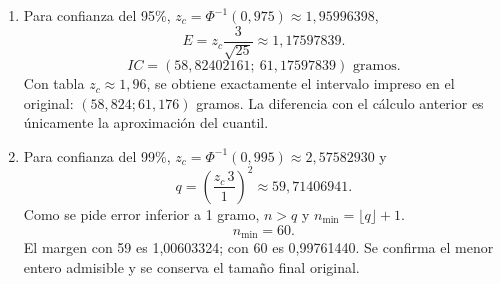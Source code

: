 \documentclass[11pt]{article}
\begin{document}
\begin{enumerate}[label=(\alph*)]\item Para confianza del 95\%, $z_c=\Phi^{-1}(0,975)\approx1,95996398$,
\[E=z_c\frac{3}{\sqrt{25}}\approx1,17597839.\]
\[IC=\boxed{(58,82402161;\ 61,17597839)}\text{ gramos}.\]
Con tabla $z_c\approx1,96$, se obtiene exactamente el intervalo impreso en el original: $(58,824;61,176)$ gramos. La diferencia con el cálculo anterior es únicamente la aproximación del cuantil.
\item Para confianza del 99\%, $z_c=\Phi^{-1}(0,995)\approx2,57582930$ y
\[q=\left(\frac{z_c\,3}{1}\right)^2\approx59,71406941.\]
Como se pide error inferior a 1 gramo, $n>q$ y $n_{\min}=\lfloor q\rfloor+1$.
\[\boxed{n_{\min}=60}.\]
El margen con 59 es 1,00603324; con 60 es 0,99761440. Se confirma el menor entero admisible y se conserva el tamaño final original.
\end{enumerate}
\clearpage
\end{document}
